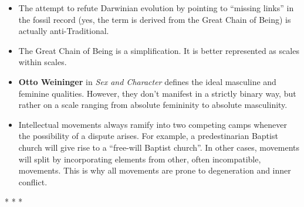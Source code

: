 \begin{itemize}
\item The attempt to refute Darwinian evolution by pointing to “missing links” in the fossil record (yes, the term is derived from the Great Chain of Being) is actually anti-Traditional. 
\item The Great Chain of Being is a simplification. It is better represented as scales within scales. 
\item \textbf{Otto Weininger} in \emph{Sex and Character} defines the ideal masculine and feminine qualities. However, they don't manifest in a strictly binary way, but rather on a scale ranging from absolute femininity to absolute masculinity. 
\item Intellectual movements always ramify into two competing camps whenever the possibility of a dispute arises. For example, a predestinarian Baptist church will give rise to a “free-will Baptist church”. In other cases, movements will split by incorporating elements from other, often incompatible, movements. This is why all movements are prone to degeneration and inner conflict. 
\end{itemize}

\begin{center}* * *\end{center}

